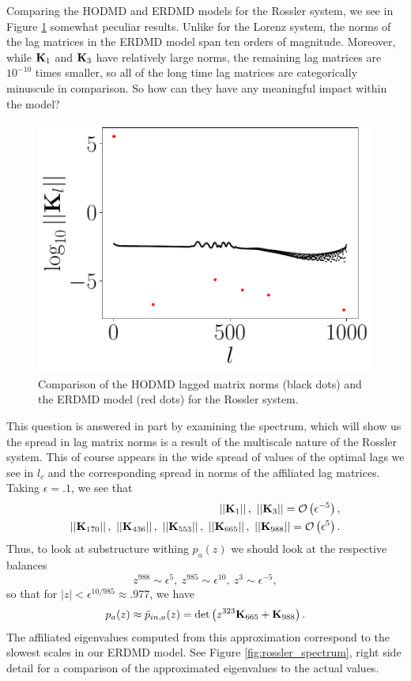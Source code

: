 \documentclass[a4paper,11pt]{article}
\newcommand{\gnorm}[1]{\left|\left|#1\right|\right|}
\begin{document}
Comparing the HODMD and ERDMD models for the Rossler system, we see in Figure \ref{fig:model_comp_d_988} somewhat peculiar results.  Unlike for the Lorenz system, the norms of the lag matrices in the ERDMD model span ten orders of magnitude.  Moreover, while ${\bf K}_{1}$ and ${\bf K}_{3}$ have relatively large norms, the remaining lag matrices are $10^{-10}$ times smaller, so all of the long time lag matrices are categorically minuscule in comparison.  So how can they have any meaningful impact within the model?  
\begin{figure}[!h]
\centering
\includegraphics[width=.7\textwidth]{Rossler_norm_full_model_988}
\caption{Comparison of the HODMD lagged matrix norms (black dots) and the ERDMD model (red dots) for the Rossler system.}
\label{fig:model_comp_d_988}
\end{figure}

This question is answered in part by examining the spectrum, which will show us the spread in lag matrix norms is a result of the multiscale nature of the Rossler system.  This of course appears in the wide spread of values of the optimal lags we see in $l_{c}$ and the corresponding spread in norms of the affiliated lag matrices.  Taking $\epsilon=.1$, we see that
\begin{align}
\gnorm{{\bf K}_{1}}, ~ \gnorm{{\bf K}_{3}}=\mathcal{O}\left(\epsilon^{-5}\right),\\ 
\gnorm{{\bf K}_{170}}, ~ \gnorm{{\bf K}_{436}}, ~ \gnorm{{\bf K}_{553}}, ~ \gnorm{{\bf K}_{665}},  ~ \gnorm{{\bf K}_{988}} =\mathcal{O}\left(\epsilon^{5}\right).
\end{align}
Thus, to look at substructure withing $p_{a}(z)$ we should look at the respective balances
\begin{equation}
z^{988}\sim \epsilon^{5}, ~ z^{985}\sim \epsilon^{10}, ~ z^{3}\sim \epsilon^{-5},
\end{equation}
so that for $|z| < \epsilon^{10/985}\approx .977$, we have 
\begin{equation}
p_{a}(z) \approx \tilde{p}_{in,a}(z) = \text{det}\left(z^{323}{\bf K}_{665} + {\bf K}_{988} \right).
\end{equation}
The affiliated eigenvalues computed from this approximation correspond to the slowest scales in our ERDMD model.  See Figure \ref{fig:rossler_spectrum}, right side detail for a comparison of the approximated eigenvalues to the actual values.  
\end{document}
